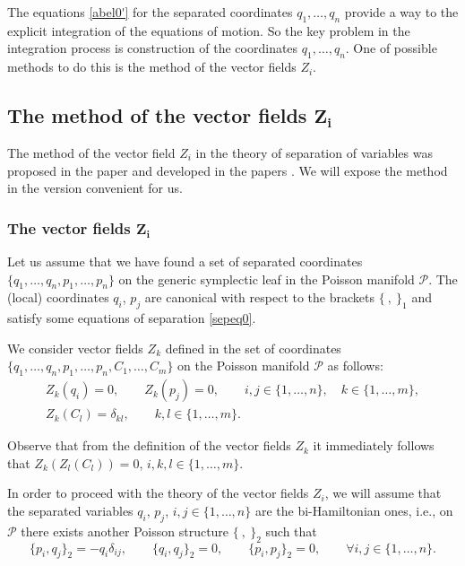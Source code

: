 \documentclass[10pt,a4paper]{amsart}
\def\d{\delta}
\numberwithin{equation}{section}
\begin{document}
The equations \eqref{abel0'} for the separated coordinates $q_1, \dots , q_n$ provide a
way to the explicit integration of the equations of motion. So the key problem in the integration process is construction of the coordinates $q_1, \dots, q_n$.
 One of possible methods to do this is the
 method of the vector fields $Z_i$.

\subsection[The method of the vector fields Z\_i]{The method of the vector fields $\boldsymbol{Z_i}$}

The method of the vector field $Z_i$ in the theory of separation
of variables was proposed in the paper
 \cite{MFP} and developed in the papers \cite{FP, FP2}. We will expose the
method in the version convenient for us.

\subsubsection[The vector fields Z\_i]{The vector fields $\boldsymbol{Z_i}$}
Let us assume that we have found a set of separated coordinates
$\{q_1, \dots , q_n, p_1, \dots , p_n\}$ on the generic symplectic leaf
in the Poisson manifold $\mathcal{P}$. The (local) coordinates $q_i$,
$p_j$ are canonical with respect to the brackets $\{ \ , \ \}_1$
 and satisfy some equations of separation \eqref{sepeq0}.

 We consider vector fields $Z_k$ defined in the set of coordinates $\{q_1, \dots , q_n,
p_1, \dots , p_n, C_1, \dots ,\allowbreak C_m\}$ on the Poisson manifold
$\mathcal{P}$ as follows:
\begin{subequations}\label{defZ}
\begin{gather}
Z_k(q_i)=0, \qquad Z_k(p_j)=0, \qquad i,j\in \{1, \dots, n\}, \quad k\in
\{1, \dots, m\},\label{defZ1}
\\
 Z_k(C_l)=\d_{kl}, \qquad k,l\in \{1, \dots ,m \}.\label{defZ2}
\end{gather}
\end{subequations}

 Observe that from the definition of the vector fields
$Z_k$ it immediately follows that
$
 Z_k (Z_l(C_l))\allowbreak=0$, $ i,k,l\in \{1, \dots, m\}$.

In order to proceed with the theory of the vector fields $Z_i$, we
will
 assume that the separated variables $q_i$, $p_j$, $i,j \in
\{1, \dots, n\}$ are the bi-Hamiltonian ones, i.e., on $\mathcal{P}$ there
exists another Poisson structure $\{\ ,\ \}_2$ such that
\begin{equation*}%
\{ p_i, q_j\}_2=-q_i\d_{ij}, \qquad \{q_i,q_j\}_2=0,\qquad
\{p_i,p_j\}_2=0, \qquad \forall i,j \in \{1, \dots, n\}.
\end{equation*}
\end{document}
